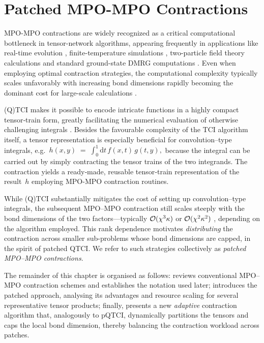 \chapter{Patched MPO-MPO Contractions}
\label{chap:MPOcontr}
MPO-MPO contractions are widely recognized as a critical computational bottleneck in tensor-network algorithms, appearing frequently in applications like real-time evolution \cite{Paeckel2019}, finite-temperature simulations \cite{Verstraete2004}, two-particle field theory calculations \cite{Rohshap2025} and standard ground-state DMRG computations \cite{Schollwock2011}. Even when employing optimal contraction strategies, the computational complexity typically scales unfavorably with increasing bond dimensions rapidly becoming the dominant cost for large-scale calculations \cite{Schollwock2011,Rohshap2025,Paeckel2019}.

(Q)TCI makes it possible to encode intricate functions in a highly compact tensor‐train form, greatly facilitating the numerical evaluation of otherwise challenging integrals \cite{Fernandez2022,Fernandez2024,Rohshap2025}.  
Besides the favourable complexity of the TCI algorithm itself, a tensor representation is especially beneficial for convolution–type integrals, e.g.\ $h(x,y)\;=\;\int_{0}^{1}\! \mathrm{d}t\,f(x,t)\,g(t,y),$
because the integral can be carried out by simply contracting the tensor trains of the two integrands.  The contraction yields a ready‐made, reusable tensor‐train representation of the result~\(h\) employing MPO-MPO contraction routines.

While (Q)TCI substantially mitigates the cost of setting up convolution–type integrals, the subsequent MPO–MPO contraction still scales steeply with the bond dimensions of the two factors—typically $\mathcal{O}(\chi^{3}\kappa)$ or $\mathcal{O}(\chi^{2}\kappa^{2})$ \cite{Stoudenmire2010} , depending on the algorithm employed.  This rank dependence motivates \emph{distributing} the contraction across smaller sub-problems whose bond dimensions are capped, in the spirit of
patched QTCI.  We refer to such strategies collectively as \emph{patched MPO–MPO contractions}.

The remainder of this chapter is organised as follows:  reviews conventional MPO–MPO contraction schemes and establishes the notation used later;   introduces the patched approach, analysing its advantages and resource scaling for several representative tensor products; finally, presents a new \emph{adaptive} contraction algorithm that, analogously to pQTCI, dynamically partitions the tensors and caps the local bond dimension, thereby balancing the contraction workload across patches.


